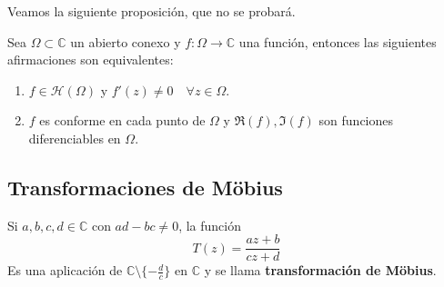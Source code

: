 Veamos la siguiente proposición, que no se probará.

\begin{proposición}
    Sea $\Omega \subset \mathbb{C}$ un abierto conexo y $f : \Omega \to \mathbb{C}$ una función, entonces las siguientes afirmaciones son equivalentes:
    \begin{enumerate}
        \item[a)] $f \in \mathcal{H}(\Omega)$ y $f'(z) \neq 0 \quad \forall z \in \Omega$.
        \item[b)] $f$ es conforme en cada punto de $\Omega$ y $\Re(f), \Im(f)$ son funciones diferenciables en $\Omega$. 
    \end{enumerate}
\end{proposición}

\subsection{Transformaciones de Möbius}

\begin{definición}
    Si $a,b,c,d \in \mathbb{C}$ con $ad - bc \neq 0$, la función
\[
    T(z) = \frac{az + b}{cz + d}
\]
Es una aplicación de $\mathbb{C} \setminus \{-\frac{d}{c}\}$ en $\mathbb{C}$ y se llama \textbf{transformación de Möbius}.
\end{definición}

